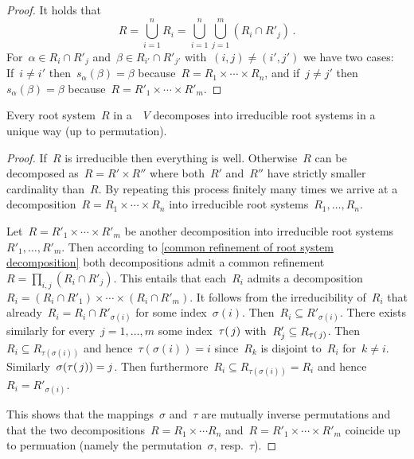 \begin{proof}
  It holds that
  \[
    R
    =
    \bigcup_{i=1}^n R_i
    =
    \bigcup_{i=1}^n \bigcup_{j=1}^m (R_i \cap R'_j) \,.
  \]
  For~$\alpha \in R_i \cap R'_j$ and~$\beta \in R_{i'} \cap R'_{j'}$ with~$(i,j) \neq (i',j')$ we have two cases:
  If~$i \neq i'$ then~$s_\alpha(\beta) = \beta$ because~$R = R_1 \times \dotsb \times R_n$, and if~$j \neq j'$ then~$s_\alpha(\beta) = \beta$ because~$R = R'_1 \times \dotsb \times R'_m$.
\end{proof}


\begin{corollary}
  \label{irreducible decomposition of root systems}
  Every root system~$R$ in a~{\vectorspace{$\kf$}}~$V$ decomposes into irreducible root systems in a unique way (up to permutation).
\end{corollary}


\begin{proof}
  If~$R$ is irreducible then everything is well.
  Otherwise~$R$ can be decomposed as~$R = R' \times R''$ where both~$R'$ and~$R''$ have strictly smaller cardinality than~$R$.
  By repeating this process finitely many times we arrive at a decomposition~$R = R_1 \times \dotsb \times R_n$ into irreducible root systems~$R_1, \dotsc, R_n$.
  
  Let~$R = R'_1 \times \dotsb \times R'_m$ be another decomposition into irreducible root systems~$R'_1, \dotsc, R'_m$.
  Then according to \cref{common refinement of root system decomposition} both decompositions admit a common refinement~$R = \prod_{i,j} (R_i \cap R'_j)$.
  This entails that each~$R_i$ admits a decomposition~$R_i = (R_i \cap R'_1) \times \dotsb \times (R_i \cap R'_m)$.
  It follows from the irreducibility of~$R_i$ that already~$R_i = R_i \cap R'_{\sigma(i)}$ for some index~$\sigma(i)$. Then~$R_i \subseteq R'_{\sigma(i)}$.
  There exists similarly for every~$j = 1, \dotsc, m$ some index~$\tau(\, j)$ with~$R'_j \subseteq R_{\tau(\, j)}$.
  Then~$R_i \subseteq R_{\tau(\sigma(i))}$ and hence~$\tau(\sigma(i)) = i$ since~$R_k$ is disjoint to~$R_i$ for~$k \neq i$.
  Similarly~$\sigma(\tau(\, j)) = j$.
  Then furthermore~$R_i \subseteq R_{\tau(\sigma(i))} = R_i$ and hence~$R_i = R'_{\sigma(i)}$.
  
  This shows that the mappings~$\sigma$ and~$\tau$ are mutually inverse permutations and that the two decompositions~$R = R_1 \times \dotsb R_n$ and~$R = R'_1 \times \dotsb \times R'_m$ coincide up to permuation (namely the permutation~$\sigma$, resp.~$\tau$).
\end{proof}


